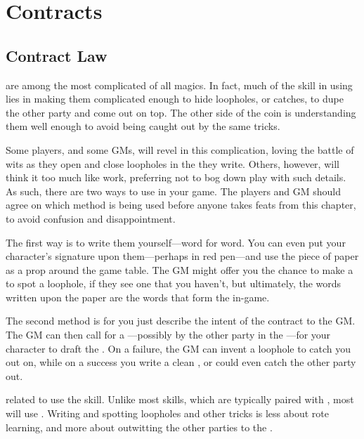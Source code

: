 \chapter{Contracts}

\section{Contract Law}

\capital{\contracts} are among the most complicated of all magics.
In fact, much of the skill in using {\contracts} lies in making them complicated enough to hide loopholes, or catches, to dupe the other party and come out on top.
The other side of the coin is understanding them well enough to avoid being caught out by the same tricks.

Some players, and some GMs, will revel in this complication, loving the battle of wits as they open and close loopholes in the {\contracts} they write.
Others, however, will think it too much like work, preferring not to bog down play with such details.
As such, there are two ways to use {\contracts} in your game.
The players and GM should agree on which method is being used before anyone takes feats from this chapter, to avoid confusion and disappointment.

The first way is to write them yourself---word for word.
You can even put your character's signature upon them---perhaps in red pen---and use the piece of paper as a prop around the game table.
The GM might offer you the chance to make a {\test} to spot a loophole, if they see one that you haven't, but ultimately, the words written upon the paper are the words that form the {\contract} in-game.

The second method is for you just describe the intent of the contract to the GM.
The GM can then call for a {\test}---possibly {\opposed} by the other party in the {\contract}---for your character to draft the {\contract}.
On a failure, the GM can invent a loophole to catch you out on, while on a success you write a clean {\contract}, or could even catch the other party out.

\capital{\tests} related to {\contracts} use the  skill.
Unlike most  skills, which are typically paired with , most  {\tests} will use .
Writing and spotting loopholes and other tricks is less about rote learning, and more about outwitting the other parties to the {\contract}.

